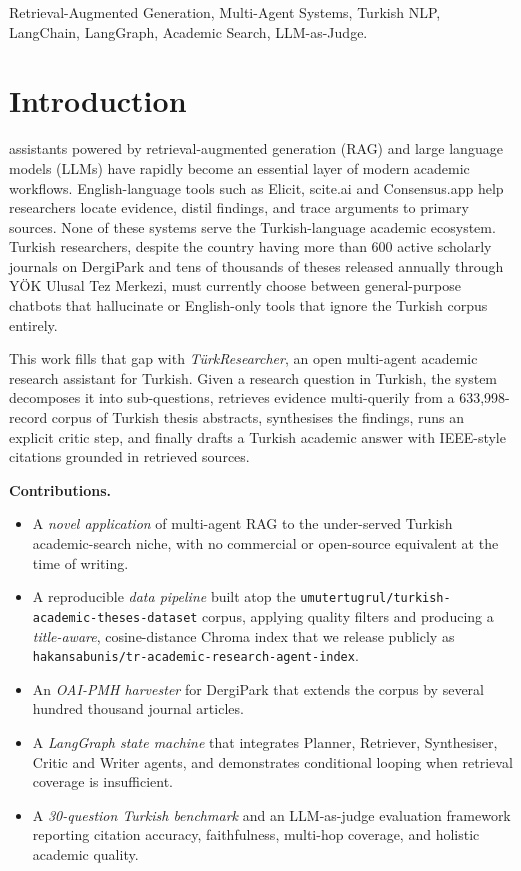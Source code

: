 \documentclass[conference]{IEEEtran}
\begin{document}
\begin{IEEEkeywords}
Retrieval-Augmented Generation, Multi-Agent Systems, Turkish NLP, LangChain,
LangGraph, Academic Search, LLM-as-Judge.
\end{IEEEkeywords}

\section{Introduction}

 assistants powered by retrieval-augmented generation
(RAG) and large language models (LLMs) have rapidly become an essential layer
of modern academic workflows. English-language tools such as Elicit, scite.ai
and Consensus.app help researchers locate evidence, distil findings, and trace
arguments to primary sources. None of these systems serve the Turkish-language
academic ecosystem. Turkish researchers, despite the country having more than
600 active scholarly journals on DergiPark and tens of thousands of theses
released annually through YÖK Ulusal Tez Merkezi, must currently choose
between general-purpose chatbots that hallucinate or English-only tools that
ignore the Turkish corpus entirely.

This work fills that gap with \textit{T\"urkResearcher}, an open multi-agent
academic research assistant for Turkish. Given a research question in Turkish,
the system decomposes it into sub-questions, retrieves evidence multi-querily
from a 633{,}998-record corpus of Turkish thesis abstracts, synthesises the
findings, runs an explicit critic step, and finally drafts a Turkish academic
answer with IEEE-style citations grounded in retrieved sources.

\textbf{Contributions.}
\begin{itemize}
\item A \emph{novel application} of multi-agent RAG to the under-served Turkish
academic-search niche, with no commercial or open-source equivalent at the
time of writing.
\item A reproducible \emph{data pipeline} built atop the
\texttt{umutertugrul/turkish-academic-theses-dataset} corpus, applying
quality filters and producing a \emph{title-aware}, cosine-distance Chroma
index that we release publicly as
\texttt{hakansabunis/tr-academic-research-agent-index}.
\item An \emph{OAI-PMH harvester} for DergiPark that extends the corpus by
several hundred thousand journal articles.
\item A \emph{LangGraph state machine} that integrates Planner, Retriever,
Synthesiser, Critic and Writer agents, and demonstrates conditional looping
when retrieval coverage is insufficient.
\item A \emph{30-question Turkish benchmark} and an LLM-as-judge evaluation
framework reporting citation accuracy, faithfulness, multi-hop coverage, and
holistic academic quality.
\end{itemize}
\end{document}
